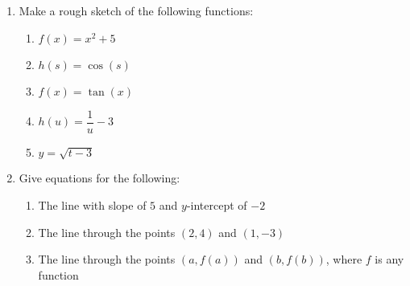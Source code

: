 \documentclass[a4paper,10pt]{article}
\begin{document}
\begin{enumerate}
\item Make a rough sketch of the following functions:

\begin{enumerate}
\item $f(x) = x^2 + 5$
\vspace{0.8in}
\item $h(s) =\cos(s)$
\vspace{0.8in}
\item $f(x) =\tan(x)$
\vspace{0.8in}
\item $ h(u) = \dfrac{1}{u}-3$
\vspace{0.8in}
\item $ y = \sqrt{t-3}$
\vspace{0.8in}

\end{enumerate}


\item Give equations for the following:

\begin{enumerate}
\item The line with slope of $5$ and $y$-intercept of $-2$
\vspace{0.8in}
\item The line through the points $(2,4)$ and $(1,-3)$
\vspace{0.8in}
\item The line through the points $(a,f(a))$ and $(b,f(b))$, where $f$ is any function
\vspace{0.8in}

\end{enumerate}


\vspace{0.5in}



\end{enumerate}
\end{document}
